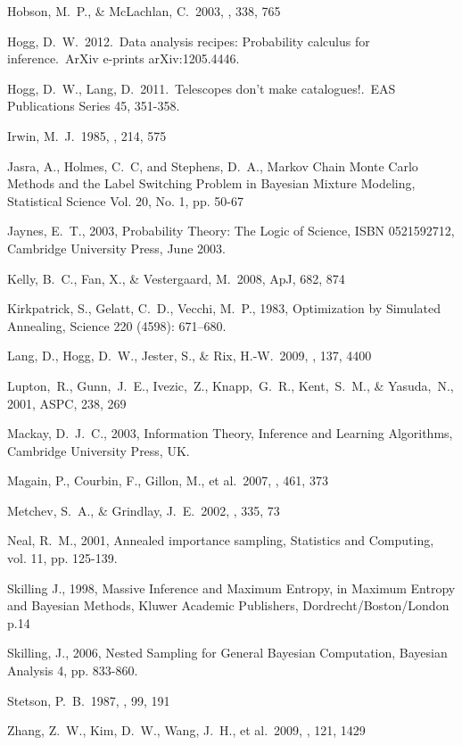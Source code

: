 \documentclass[12pt, preprint]{aastex}
\begin{document}
\begin{thebibliography}{99}
 Hobson, M.~P., \& McLachlan, C.\ 2003, \mnras, 338, 765 

 Hogg, D.~W.\ 2012.\ Data analysis
recipes: Probability calculus for inference.\ ArXiv e-prints
arXiv:1205.4446.

 Hogg, D.~W., Lang, D.\
2011.\ Telescopes don't make catalogues!.\ EAS Publications Series 45,
351-358.

 Irwin, M.~J.\ 1985, \mnras, 214,
575

 Jasra, A., Holmes, C.~C, and
Stephens, D.~A., Markov Chain Monte Carlo Methods and the Label Switching
Problem in Bayesian Mixture Modeling, Statistical Science
Vol. 20, No. 1, pp. 50-67

 Jaynes, E.~T., 2003, Probability Theory: The
Logic of Science, ISBN 0521592712, Cambridge University Press, June 2003.

 Kelly, B.~C., Fan, X.,
\& Vestergaard, M.\ 2008, ApJ, 682, 874

Kirkpatrick, S., Gelatt, C.~D., Vecchi, M.~P., 1983,
Optimization by Simulated Annealing, Science 220 (4598): 671–680.

 Lang, D., Hogg, D.~W., 
Jester, S., \& Rix, H.-W.\ 2009, \aj, 137, 4400 

Lupton,~R., Gunn,~J.~E., Ivezic,~Z., Knapp,~G.~R., Kent,~S.~M., \& Yasuda,~N., 2001, ASPC, 238, 269

 Mackay, D.~J.~C., 2003, Information Theory,
Inference and Learning Algorithms, Cambridge University Press, UK.

 Magain, P., Courbin, F., Gillon, M., et al.\ 2007, \aap, 461, 373 

 Metchev, S.~A., \& Grindlay, J.~E.\ 2002, \mnras, 335, 73 

 Neal, R.~M., 2001, 
Annealed importance sampling, Statistics and Computing, vol. 11, pp. 125-139.

Skilling J., 1998, Massive Inference and Maximum Entropy, in Maximum Entropy
and Bayesian Methods, Kluwer Academic Publishers, Dordrecht/Boston/London p.14

 Skilling, J., 2006, Nested Sampling for General Bayesian Computation, Bayesian Analysis 4, pp. 833-860.

 Stetson, P.~B.\ 1987, \pasp,
99, 191

 Zhang, Z.~W., Kim, D.~W., 
Wang, J.~H., et al.\ 2009, \pasp, 121, 1429 
\end{thebibliography}
\end{document}
